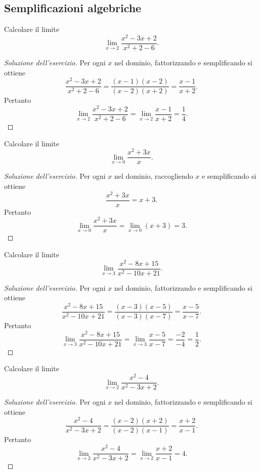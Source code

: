 \subsection{Semplificazioni algebriche}
\label{sec:esercizi-limiti-semplificazioni-algebriche}

\begin{exercise}
\label{ex:limiti-foglio-2311-04}
Calcolare il limite
\[
  \lim_{x\to2}\frac{x^2-3x+2}{x^2+2-6}.
\]
\end{exercise}
\begin{proof}[Soluzione dell'esercizio]
Per ogni $x$ nel dominio, fattorizzando e semplificando si ottiene
\[
  \frac{x^2-3x+2}{x^2+2-6}
  =\frac{(x-1)(x-2)}{(x-2)(x+2)}
  =\frac{x-1}{x+2}.
\]
Pertanto
\[
  \lim_{x\to2}\frac{x^2-3x+2}{x^2+2-6}
  =\lim_{x\to2}\frac{x-1}{x+2}
  =\frac14.
\]
\end{proof}

\begin{exercise}
\label{ex:limiti-foglio-2311-05}
Calcolare il limite
\[
  \lim_{x\to0}\frac{x^2+3x}{x}.
\]
\end{exercise}
\begin{proof}[Soluzione dell'esercizio]
Per ogni $x$ nel dominio, raccogliendo $x$ e semplificando si ottiene
\[
  \frac{x^2+3x}{x}=x+3.
\]
Pertanto
\[
  \lim_{x\to0}\frac{x^2+3x}{x}
  =\lim_{x\to0}(x+3)=3.
\]
\end{proof}

\begin{exercise}
\label{ex:limiti-foglio-2311-06}
Calcolare il limite
\[
  \lim_{x\to3}\frac{x^2-8x+15}{x^2-10x+21}.
\]
\end{exercise}
\begin{proof}[Soluzione dell'esercizio]
Per ogni $x$ nel dominio, fattorizzando e semplificando si ottiene
\[
  \frac{x^2-8x+15}{x^2-10x+21}
  =\frac{(x-3)(x-5)}{(x-3)(x-7)}
  =\frac{x-5}{x-7}.
\]
Pertanto
\[
  \lim_{x\to3}\frac{x^2-8x+15}{x^2-10x+21}
  =\lim_{x\to3}\frac{x-5}{x-7}
  =\frac{-2}{-4}=\frac12.
\]
\end{proof}

\clearpage

\begin{exercise}
\label{ex:limiti-foglio-2311-08}
Calcolare il limite
\[
  \lim_{x\to2}\frac{x^2-4}{x^2-3x+2}.
\]
\end{exercise}
\begin{proof}[Soluzione dell'esercizio]
Per ogni $x$ nel dominio, fattorizzando e semplificando si ottiene
\[
  \frac{x^2-4}{x^2-3x+2}
  =\frac{(x-2)(x+2)}{(x-2)(x-1)}
  =\frac{x+2}{x-1}.
\]
Pertanto
\[
  \lim_{x\to2}\frac{x^2-4}{x^2-3x+2}
  =\lim_{x\to2}\frac{x+2}{x-1}=4.
\]
\end{proof}
